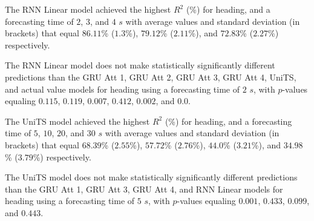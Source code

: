 \begin{table}[!ht]
	\centering
	\caption{The average $R^{2}$ (\%), with standard deviation in brackets, across $k$-fold validation datasets for the heading estimated on the $k$-fold testing datasets by different RNN models, and forecasting times.}
	\label{tab:best_direction_R2}
\end{table}

The RNN Linear model achieved the highest $R^{2}$ (\%) for heading, and a forecasting time of $2$, $3$, and $4$ $s$ with average values and standard deviation (in brackets) that equal $86.11$\% ($1.3$\%), $79.12$\% ($2.11$\%), and $72.83$\% ($2.27$\%) respectively.

The RNN Linear model does not make statistically significantly different predictions than the GRU Att 1, GRU Att 2, GRU Att 3, GRU Att 4, UniTS, and actual value models for heading using a forecasting time of $2$ $s$, with $p$-values equaling $0.115$, $0.119$, $0.007$, $0.412$, $0.002$, and $0.0$.

The UniTS model achieved the highest $R^{2}$ (\%) for heading, and a forecasting time of $5$, $10$, $20$, and $30$ $s$ with average values and standard deviation (in brackets) that equal $68.39$\% ($2.55$\%), $57.72$\% ($2.76$\%), $44.0$\% ($3.21$\%), and $34.98$\% ($3.79$\%) respectively.

The UniTS model does not make statistically significantly different predictions than the GRU Att 1, GRU Att 3, GRU Att 4, and RNN Linear models for heading using a forecasting time of $5$ $s$, with $p$-values equaling $0.001$, $0.433$, $0.099$, and $0.443$.

